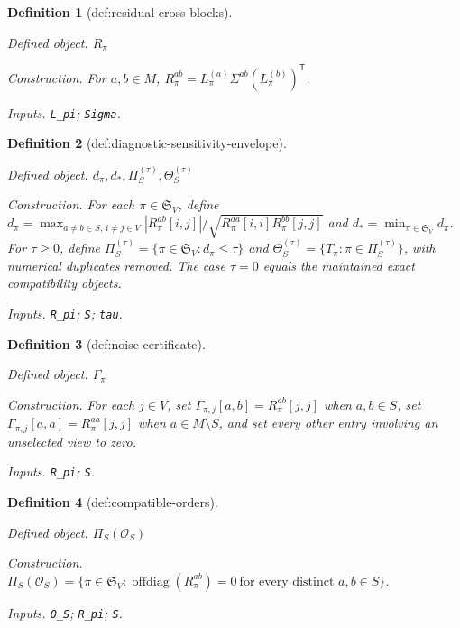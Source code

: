\documentclass{article}
\newtheorem{definition}{Definition}
\begin{document}
\begin{definition}[def:residual-cross-blocks]\label{def:residual-cross-blocks}
\par\smallskip\noindent\emph{Defined object.} \(R_\pi\)
\par\smallskip\noindent\emph{Construction.} For \(a,b\in M\), \(R_\pi^{ab}=L_\pi^{(a)}\Sigma^{ab}(L_\pi^{(b)})^{\mathsf T}\).
\par\smallskip\noindent\emph{Inputs.} \texttt{L\_\allowbreak{}pi}; \texttt{Sigma}.
\end{definition}

\begin{definition}[def:diagnostic-sensitivity-envelope]\label{def:diagnostic-sensitivity-envelope}
\par\smallskip\noindent\emph{Defined object.} \(d_\pi,d_*,\Pi_S^{(\tau)},\Theta_S^{(\tau)}\)
\par\smallskip\noindent\emph{Construction.} For each \(\pi\in\mathfrak S_V\), define \(d_\pi=\max_{a\ne b\in S,\,i\ne j\in V}|R_\pi^{ab}[i,j]|/\sqrt{R_\pi^{aa}[i,i]R_\pi^{bb}[j,j]}\) and \(d_*=\min_{\pi\in\mathfrak S_V}d_\pi\). For \(\tau\ge0\), define \(\Pi_S^{(\tau)}=\{\pi\in\mathfrak S_V:d_\pi\le\tau\}\) and \(\Theta_S^{(\tau)}=\{T_\pi:\pi\in\Pi_S^{(\tau)}\}\), with numerical duplicates removed. The case \(\tau=0\) equals the maintained exact compatibility objects.
\par\smallskip\noindent\emph{Inputs.} \texttt{R\_\allowbreak{}pi}; \texttt{S}; \texttt{tau}.
\end{definition}

\begin{definition}[def:noise-certificate]\label{def:noise-certificate}
\par\smallskip\noindent\emph{Defined object.} \(\Gamma_\pi\)
\par\smallskip\noindent\emph{Construction.} For each \(j\in V\), set \(\Gamma_{\pi,j}[a,b]=R_\pi^{ab}[j,j]\) when \(a,b\in S\), set \(\Gamma_{\pi,j}[a,a]=R_\pi^{aa}[j,j]\) when \(a\in M\setminus S\), and set every other entry involving an unselected view to zero.
\par\smallskip\noindent\emph{Inputs.} \texttt{R\_\allowbreak{}pi}; \texttt{S}.
\end{definition}

\begin{definition}[def:compatible-orders]\label{def:compatible-orders}
\par\smallskip\noindent\emph{Defined object.} \(\Pi_S(\mathcal O_S)\)
\par\smallskip\noindent\emph{Construction.} \(\Pi_S(\mathcal O_S)=\{\pi\in\mathfrak S_V:\operatorname{offdiag}(R_\pi^{ab})=0\ \text{for every distinct }a,b\in S\}\).
\par\smallskip\noindent\emph{Inputs.} \texttt{O\_\allowbreak{}S}; \texttt{R\_\allowbreak{}pi}; \texttt{S}.
\end{definition}
\end{document}
